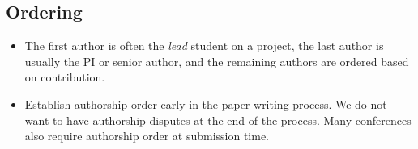 \documentclass[oneside,11pt]{book}
\begin{document}
\subsection{Ordering}
\begin{itemize}
\item The first author is often the \emph{lead} student on a project, the last author is usually the PI or senior author, and the remaining authors are ordered based on contribution. 
\item Establish authorship order early in the paper writing process.  We do not want to have authorship disputes at the end of the process. Many conferences also require authorship order at submission time.
\end{itemize}



\end{document}
